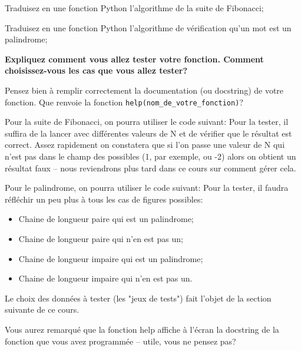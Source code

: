 \documentclass[12pt]{article}
\begin{document}
	\begin{MonExo}
		\begin{alphenum}
			\item Traduisez en une fonction Python l'algorithme de la suite de Fibonacci;
			\item Traduisez en une fonction Python l'algorithme de vérification qu'un mot est un palindrome;
			\item \textbf{Expliquez comment vous allez tester votre fonction. Comment choisissez-vous les cas que vous allez tester?}
		\end{alphenum}
		\vspace{\baselineskip}
		Pensez bien à remplir correctement la documentation (ou docstring) de votre fonction. Que renvoie la fonction \texttt{help(nom\_de\_votre\_fonction)}?
	\end{MonExo}
	
	\begin{MaReponse}
		Pour la suite de Fibonacci, on pourra utiliser le code suivant:
		Pour la tester, il suffira de la lancer avec différentes valeurs de N et de vérifier que le résultat est correct. Assez rapidement on constatera que si l'on passe une valeur de N qui n'est pas dans le champ des possibles (1, par exemple, ou -2) alors on obtient un résultat faux -- nous reviendrons plus tard dans ce cours sur comment gérer cela.
		\vspace{\baselineskip}
		
		Pour le palindrome, on pourra utiliser le code suivant:
		Pour la tester, il faudra réfléchir un peu plus à tous les cas de figures possibles:
		\begin{itemize}
			\item Chaine de longueur paire qui est un palindrome;
			\item Chaine de longueur paire qui n'en est pas un;
			\item Chaine de longueur impaire qui est un palindrome;
			\item Chaine de longueur impaire qui n'en est pas un.
		\end{itemize}
		
		Le choix des données à tester (les "jeux de tests") fait l'objet de la section suivante de ce cours.
		
		Vous aurez remarqué que la fonction help affiche à l'écran la docstring de la fonction que vous avez programmée -- utile, vous ne pensez pas?
	\end{MaReponse}
	
\end{document}
